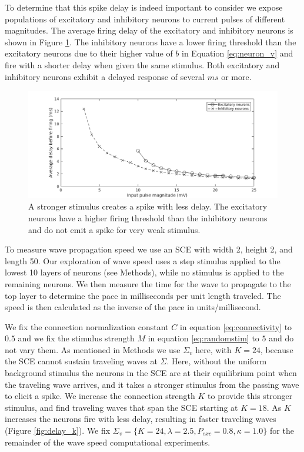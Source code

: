 \documentclass[12pt]{article}
\begin{document}
To determine \color{red} that this spike delay is indeed important to consider \color{black} we expose populations of excitatory and inhibitory neurons to current pulses of different magnitudes.
The average firing delay of the excitatory and inhibitory neurons is shown in Figure \ref{fig:delay_neurondynamics}.
The inhibitory neurons have a lower firing threshold than the excitatory neurons \color{red}due to their higher value of $b$ in Equation \ref{eq:neuron_v} \color{black} \parencite{izhikevich2003} and fire with a shorter delay when given the same stimulus.
Both excitatory and inhibitory neurons exhibit a delayed response of several $ms$ or more.
\begin{figure}[!htb]
 \caption{ A stronger stimulus creates a spike with less delay. The excitatory neurons have a higher firing threshold than the inhibitory neurons and do not emit a spike for very weak stimulus.}
 \label{fig:delay_neurondynamics}
 \centering
   \includegraphics[width=\textwidth]{fig/WaveSpeed_NeuronDynamics}
\end{figure}

\FloatBarrier

To measure wave propagation speed we use an SCE with width 2, height 2, and length 50.
Our exploration of wave speed uses a step stimulus applied to the lowest 10 layers of neurons (see Methods), while no stimulus is applied to the remaining neurons.
We then measure the time for the wave to propagate to the top layer to determine the pace in milliseconds per unit length traveled.
The speed is then calculated as the inverse of the pace in units/millisecond.

We fix the connection normalization constant $C$ in equation \ref{eq:connectivity} to $0.5$ and we fix the stimulus strength $M$ in equation \ref{eq:randomstim} to $5$ and do not vary them.
As mentioned in Methods we use $\Sigma_v$ here, with $K=24$, because the SCE cannot sustain traveling waves at $\Sigma$. 
Here, without the uniform background stimulus the neurons in the SCE are at their equilibrium point when the traveling wave arrives, and it takes a stronger stimulus from the passing wave to elicit a spike.
We increase the connection strength $K$ to provide this stronger stimulus, and find traveling waves that span the SCE starting at $K=18$. 
As $K$ increases the neurons fire with less delay, resulting in faster traveling waves (Figure \ref{fig:delay_k}).
We fix $\Sigma_v = \{K=24,\lambda=2.5,P_{exc}=0.8,\kappa=1.0 \}$ for the remainder of the wave speed computational experiments.
\end{document}

